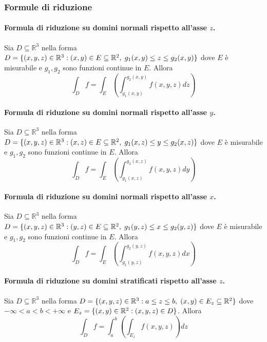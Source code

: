        \subsubsection{Formule di riduzione}
            \paragraph*{Formula di riduzione su domini normali rispetto all'asse $z$.}
                Sia $D \subseteq \mathbb{R}^{3}$ nella forma $D = \{(x, y, z) \in \mathbb{R}^{3} \mathrel{:} (x, y) \in E \subseteq \mathbb{R}^{2}, \; g_{1}(x, y) \leq z \leq g_{2}(x, y)\}$ dove $E$ è misurabile e $g_{1}, g_{2}$ sono funzioni continue in $E$.
                Allora
                \[
                    \int_{D} f = \int_{E} \left( \int_{g_{1}(x, y)}^{g_{2}(x, y)} f(x, y, z) dz \right)
                \]

            \paragraph*{Formula di riduzione su domini normali rispetto all'asse $y$.}
                Sia $D \subseteq \mathbb{R}^{3}$ nella forma $D = \{(x, y, z) \in \mathbb{R}^{3} \mathrel{:} (x, z) \in E \subseteq \mathbb{R}^{2}, \; g_{1}(x, z) \leq y \leq g_{2}(x, z)\}$ dove $E$ è misurabile e $g_{1}, g_{2}$ sono funzioni continue in $E$.
                Allora
                \[
                    \int_{D} f = \int_{E} \left( \int_{g_{1}(x, z)}^{g_{2}(x, z)} f(x, y, z) dy \right)
                \]

            \paragraph*{Formula di riduzione su domini normali rispetto all'asse $x$.}
                Sia $D \subseteq \mathbb{R}^{3}$ nella forma $D = \{(x, y, z) \in \mathbb{R}^{3} \mathrel{:} (y, z) \in E \subseteq \mathbb{R}^{2}, \; g_{1}(y, z) \leq x \leq g_{2}(y, z)\}$ dove $E$ è misurabile e $g_{1}, g_{2}$ sono funzioni continue in $E$.
                Allora
                \[
                    \int_{D} f = \int_{E} \left( \int_{g_{1}(y, z)}^{g_{2}(y, z)} f(x, y, z) dx \right)
                \]

            \paragraph*{Formula di riduzione su domini stratificati rispetto all'asse $z$.}
                Sia $D \subseteq \mathbb{R}^{3}$ nella forma $D = \{(x, y, z) \in \mathbb{R}^{3} \mathrel{:} a \leq z \leq b, \; (x, y) \in E_{z} \subseteq \mathbb{R}^{2}\}$ dove $-\infty < a < b < +\infty$ e $E_{z} = \{ (x, y) \in \mathbb{R}^{2} \mathrel{:} (x, y, z) \in D\}$.
                Allora
                \[
                    \int_{D} f = \int_{a}^{b} \left( \int_{E_{z}} f(x, y, z) \right) dz
                \]

